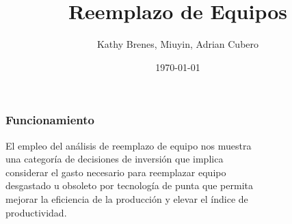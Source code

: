 \documentclass{beamer}
\begin{document}
\title{Reemplazo de Equipos}
 \author{Kathy Brenes, Miuyin, Adrian Cubero}
\date{\today}
 \frame{\titlepage}
 \begin{frame}
\color{black}
\frametitle{Funcionamiento}
El empleo del análisis de reemplazo de equipo nos muestra 
\\una categoría de decisiones de inversión que implica 
\\considerar el gasto necesario para reemplazar equipo 
\\ desgastado u obsoleto por tecnología de punta que permita
\\ mejorar la eficiencia de la producción y elevar el índice de 
\\ productividad.
\end{frame} 
\end{document}
